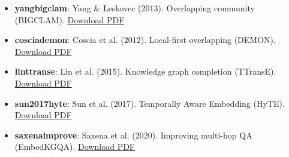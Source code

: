 \documentclass[10pt,journal,compsoc]{IEEEtran}
\begin{document}
\begin{itemize}
\item \textbf{yang\-bigclam}: Yang \& Leskovec (2013). Overlapping community (BIGCLAM). \href{https://arxiv.org/pdf/1205.6228.pdf}{Download PDF}
\item \textbf{coscia\-demon}: Coscia et al. (2012). Local-first overlapping (DEMON). \href{https://arxiv.org/pdf/1206.0629.pdf}{Download PDF}
\item \textbf{lin\-ttranse}: Lin et al. (2015). Knowledge graph completion (TTransE). \href{https://thunlp.org/~lzy/publications/aaai2015_transr.pdf}{Download PDF}
\item \textbf{sun2017hyte}: Sun et al. (2017). Temporally Aware Embedding (HyTE). \href{https://www.researchgate.net/profile/Shibiao_Sun/publication/320448102_Hyte_Joint_embedding_of_entities_relations_and_time/links/5a9e59d9a6fdcc546ad881f3/Hyte-Joint-embedding-of-entities-relations-and-time.pdf}{Download PDF}
\item \textbf{saxena\-improve}: Saxena et al. (2020). Improving multi-hop QA (EmbedKGQA). \href{https://arxiv.org/pdf/1909.11855.pdf}{Download PDF}

\end{itemize}



\end{document}
